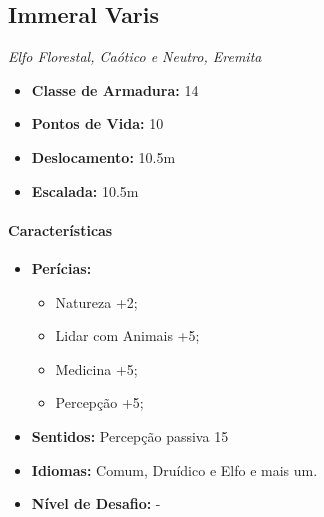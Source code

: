 \documentclass[a4paper,12p]{book}
\begin{document}
	\begin{multicols}{2}
		\subsection{Immeral Varis}
		\textit{Elfo Florestal, Caótico e Neutro, Eremita}

		\begin{itemize}
			\item \textbf{Classe de Armadura:} 14
			\item \textbf{Pontos de Vida:} 10
			\item \textbf{Deslocamento:} 10.5m
			\item \textbf{Escalada:} 10.5m
		\end{itemize}
		\begin{center}
		\end{center}

		\paragraph{Características}
		
		\begin{itemize}
			
			\item \textbf{Perícias:}
			
			\begin{itemize}
				\item Natureza +2;
				\item Lidar com Animais +5;
				\item Medicina +5;
				\item Percepção +5;
			\end{itemize}
		
			\item \textbf{Sentidos:} Percepção passiva 15
			
			\item \textbf{Idiomas:} Comum, Druídico e Elfo e mais um.
			
			\item \textbf{Nível de Desafio:} -
		

\end{itemize}
\end{multicols}
\end{document}
